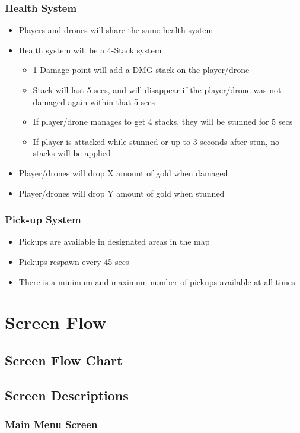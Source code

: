 \documentclass[14pt]{report}
\begin{document}
\subsubsection{Health System}
\begin{itemize}
    \item Players and drones will share the same health system
    \item Health system will be a 4-Stack system
    \begin{itemize}
        \item 1 Damage point will add a DMG stack on the player/drone
        \item Stack will last 5 secs, and will disappear if the player/drone was not damaged again within that 5 secs
        \item If player/drone manages to get 4 stacks, they will be stunned for 5 secs
        \item If player is attacked while stunned or up to 3 seconds after stun, no stacks will be applied
    \end{itemize}
    \item Player/drones will drop X amount of gold when damaged
    \item Player/drones will drop Y amount of gold when stunned
\end{itemize}
\subsubsection{Pick-up System}
\begin{itemize}
    \item Pickups are available in designated areas in the map
    \item Pickups respawn every 45 secs
    \item There is a minimum and maximum number of pickups available at all times
\end{itemize}
\section{Screen Flow}
\subsection{Screen Flow Chart}
\subsection{Screen Descriptions}
\subsubsection{Main Menu Screen}
\end{document}
